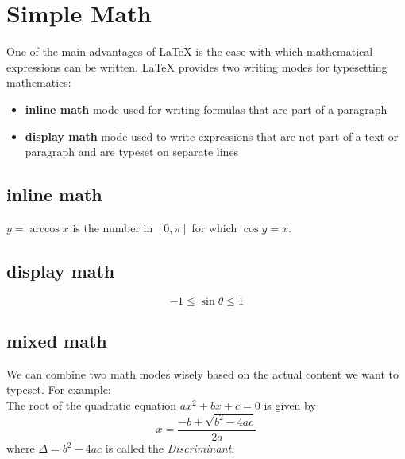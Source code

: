 \documentclass{article}
\begin{document}
\section{Simple Math}
One of the main advantages of \LaTeX{} is the ease with which mathematical expressions can be written. \LaTeX{} provides two writing modes for typesetting mathematics:

\begin{itemize}
\item
\textbf{inline math} mode used for writing formulas that are part of a paragraph
\item
\textbf{display math} mode used to write expressions that are not part of a text or paragraph and are typeset on separate lines
\end{itemize}

\subsection{inline math}
$y=\arccos x$ is the number in $[0,\pi]$ for which $\cos y = x$.

\subsection{display math}
$$-1\leq\sin \theta\leq 1$$

\subsection{mixed math}
We can combine two math modes wisely based on the actual content we want to typeset. For example:\\

The root of the quadratic equation $ax^2+bx+c=0$ is given by
\[
x=\frac{-b\pm\sqrt{b^2-4ac}}{2a} 
\]
where $\Delta=b^2-4ac$ is called the \textit{Discriminant}.
\end{document}
